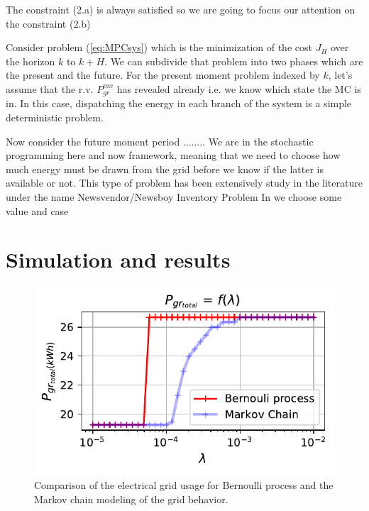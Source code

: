 \documentclass{ifacconf}
\begin{document}
The constraint (2.a) is always satisfied so we are going to focus our attention on the constraint (2.b)

Consider problem (\ref{eq:MPCsys}) which is the minimization of the cost $J_H$ over the horizon $k$ to $k+H$. We can subdivide that problem into two phases which are the present and the future. For the present moment problem indexed by $k$, let's assume that the r.v. $P_{gr}^{mx}$ has revealed already i.e. we know which state the MC is in. In this case, dispatching the energy in each branch of the system is a simple deterministic problem. 

Now consider the future moment period ........  We are in the stochastic programming here and now framework, meaning that we need to choose how much energy must be drawn from the grid before we know if the latter is available or not. This type of problem has been extensively study in the literature under the name Newsvendor/Newsboy Inventory Problem  In we choose some value and case 

 \section{Simulation and results}
 \begin{figure}[!ht]
        \begin{center}
                \includegraphics[width=1\columnwidth]{Figures/Mc_vs_Bp.pdf}
        \end{center}

        \caption{Comparison of the electrical grid usage for Bernoulli process and the Markov chain modeling of the grid behavior.
        }
        \label{fig:BernouVsMar}
\end{figure}
 
\end{document}
